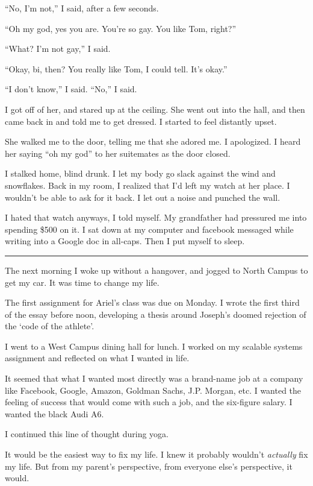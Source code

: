 ``No, I'm not,'' I said, after a few seconds.

``Oh my god, yes you are.  You're so gay.  You like Tom, right?''

``What?  I'm not gay,'' I said.

``Okay, bi, then?  You really like Tom, I could tell.  It's okay.''

``I don't know,'' I said.  ``No,'' I said.

I got off of her, and stared up at the ceiling.  She went out into the hall, and
then came back in and told me to get dressed.  I started to feel distantly
upset.

She walked me to the door, telling me that she adored me.  I apologized.  I
heard her saying ``oh my god'' to her suitemates as the door closed. 

I stalked home, blind drunk.  I let my body go slack against the wind and
snowflakes.  Back in my room, I realized that I'd left my watch at her place.  I
wouldn't be able to ask for it back.  I let out a noise and punched the wall. 

I hated that watch anyways, I told myself.  My grandfather had pressured me into
spending \$500 on it.   I sat down at my computer and facebook messaged while
writing into a Google doc in all-caps.  Then I put myself to sleep.

\plainfancybreak{12pt}{2}{}

The next morning I woke up without a hangover, and jogged to North Campus to get
my car.  It was time to change my life.

The first assignment for Ariel's class was due on Monday.  I wrote the first
third of the essay before noon, developing a thesis around Joseph's doomed
rejection of the `code of the athlete'.

I went to a West Campus dining hall for lunch.  I worked on my scalable systems
assignment and reflected on what I wanted in life.

It seemed that what I wanted most directly was a brand-name job at a company
like Facebook, Google, Amazon, Goldman Sachs, J.P.  Morgan, etc.  I wanted the
feeling of success that would come with such a job, and the six-figure salary.
I wanted the black Audi A6.

I continued this line of thought during yoga.

It would be the easiest way to fix my life.  I knew it probably wouldn't
\textit{actually} fix my life.  But from my parent's perspective, from everyone
else's perspective, it would.  


